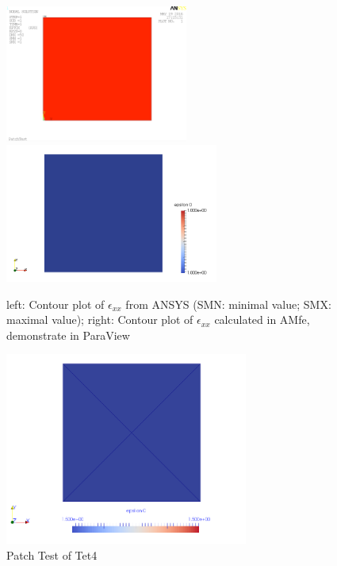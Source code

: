 \begin{figure}
	\begin{center}
		\includegraphics[width=6cm,clip]{PatchTest.png} 		
		\includegraphics[width=7cm,clip]{PatchParaView.pdf} 		
		\caption{left: Contour plot of $\epsilon_{xx}$ from ANSYS (SMN: minimal value; SMX: maximal value); right: Contour plot of $\epsilon_{xx}$ calculated in AMfe, demonstrate in ParaView} \label{fig: PatchTest}
	\end{center}
\end{figure}

\begin{figure}
	\begin{center}
		\includegraphics[width=8cm,clip]{Tet4Patch.pdf} 			
		\caption{Patch Test of Tet4} \label{fig: Tet4Patch}
	\end{center}
\end{figure}

